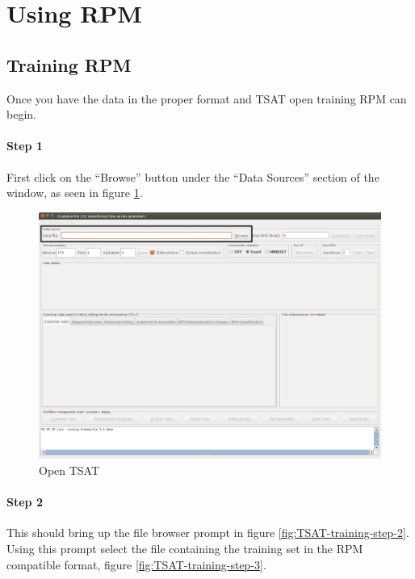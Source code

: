 \documentclass[letterpaper, 12pt]{article}
\begin{document}
\newpage
\section{Using RPM}

\subsection{Training RPM}
Once you have the data in the proper format and TSAT open training RPM can begin.

\paragraph{Step 1}
First click on the ``Browse'' button under the ``Data Sources'' section of the window, as seen in figure \ref{fig:TSAT-training-step-1}. 

\begin{figure}[h]
  \includegraphics[width=\textwidth]{TSAT-training-step-1}
  \caption{Open TSAT}
  \label{fig:TSAT-training-step-1}
\end{figure}
\newpage
\paragraph{Step 2}
This should bring up the file browser prompt in figure \ref{fig:TSAT-training-step-2}. Using this prompt select the file containing the training set in the RPM compatible format, figure \ref{fig:TSAT-training-step-3}.
\end{document}
